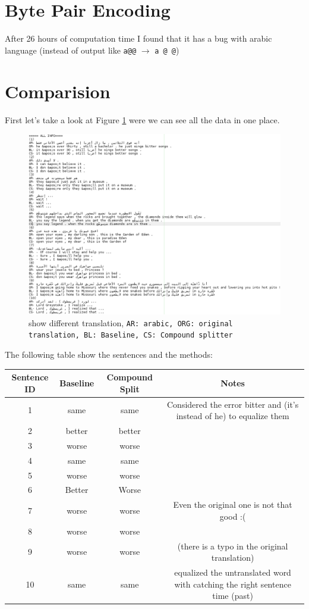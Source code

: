\documentclass{article}
\begin{document}
\section{Byte Pair Encoding}
After 26 hours of computation time I found that it has a bug with arabic language (instead of output like \texttt{a@@} \(\rightarrow\) \texttt{a @ @})
\section{Comparision}
First let's take a look at Figure \ref{fig:4} were we can see all the data in one place.
\begin{figure}[H]
\includegraphics[scale=0.5]{All.png}
\caption{show different translation, \texttt{AR: arabic, ORG: original translation, BL: Baseline, CS: Compound splitter}\label{fig:4}}
\end{figure}
The following table show the sentences and the methods:
\begin{table}[H]
\begin{tabular}{|c|c|c|c|}
\hline
Sentence ID& Baseline & Compound Split &Notes\\
\hline
1&same&same& Considered the error bitter and (it's instead of he) to equalize them\\
\hline
2&better&better&\\
\hline
3&worse&worse&\\
\hline
4&same&same&\\
\hline
5&worse&worse&\\
\hline
6&Better&Worse\\
\hline
7&worse&worse& Even the original one is not that good :( \\
\hline
8&worse&worse&\\
\hline
9&worse&worse& (there is a typo in the original translation)\\
\hline
10&same&same& equalized the untranslated word with catching the right sentence time (past) \\
\hline
\end{tabular}
\end{table}
\end{document}
